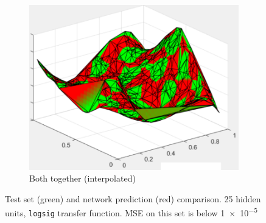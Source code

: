 \documentclass[a4paper, 10pt]{article}
\begin{document}
\begin{figure}[htb]
\begin{adjustwidth}{-1.1cm}{-1.1cm}
\begin{subfigure}[t]{0.3\linewidth}
      \includegraphics[width=1\linewidth]{./project/sim_and_test.png}
      \caption{Both together (interpolated)}
      \label{fig:underfit}
    \end{subfigure}
    \end{adjustwidth}
    \caption{Test set (green) and network prediction (red) comparison. 25 hidden units,
      \texttt{logsig} transfer function. MSE on this set is below \num{1e-5}}
    \label{fig:l5_regression_test}
  \end{figure}

    
\end{document}
